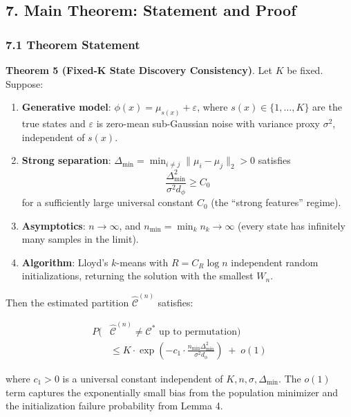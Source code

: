 \documentclass[
  12pt,
]{article}
\begin{document}
\subsection{7. Main Theorem: Statement and
Proof}\label{main-theorem-statement-and-proof}

\subsubsection{7.1 Theorem Statement}\label{theorem-statement}

\textbf{Theorem 5 (Fixed-K State Discovery Consistency)}. Let \(K\) be
fixed. Suppose:

\begin{enumerate}
\def\labelenumi{\arabic{enumi}.}
\item
  \textbf{Generative model}: \(\phi(x) = \mu_{s(x)} + \varepsilon\),
  where \(s(x) \in \{1,\dots,K\}\) are the true states and
  \(\varepsilon\) is zero-mean sub-Gaussian noise with variance proxy
  \(\sigma^2\), independent of \(s(x)\).
\item
  \textbf{Strong separation}:
  \(\Delta_{\min} = \min_{i \neq j} \|\mu_i - \mu_j\|_2 > 0\) satisfies
  \[\frac{\Delta_{\min}^2}{\sigma^2 d_\phi} \geq C_0\] for a
  sufficiently large universal constant \(C_0\) (the ``strong features''
  regime).
\item
  \textbf{Asymptotics}: \(n \to \infty\), and
  \(n_{\min} = \min_k n_k \to \infty\) (every state has infinitely many
  samples in the limit).
\item
  \textbf{Algorithm}: Lloyd's \(k\)-means with \(R = C_R \log n\)
  independent random initializations, returning the solution with the
  smallest \(W_n\).
\end{enumerate}

Then the estimated partition \(\hat{\mathcal{C}}^{(n)}\) satisfies:

\[\begin{aligned}
P\bigl(&\hat{\mathcal{C}}^{(n)} \neq \mathcal{C}^* \text{ up to permutation}\bigr) \\
&\leq K \cdot \exp\left(-c_1 \cdot \frac{n_{\min} \Delta_{\min}^2}{\sigma^2 d_\phi}\right) \;+\; o(1)
\end{aligned}\]

where \(c_1 > 0\) is a universal constant independent of
\(K, n, \sigma, \Delta_{\min}\). The \(o(1)\) term captures the
exponentially small bias from the population minimizer and the
initialization failure probability from Lemma 4.
\end{document}
